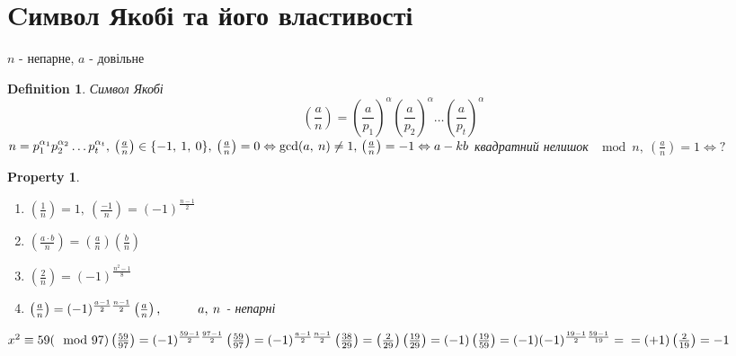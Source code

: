 \documentclass[a4paper,12pt]{bookest}
\newtheorem{definition}{Definition}[section]
\newtheorem*{property*}{Property}
\newcommand\tab[1][1cm]{\hspace*{#1}}
\begin{document}
\section{Cимвол Якобі та його властивості}
$n$ - непарне, $a$ - довільне
\begin{definition}Символ Якобі
	$$\left(\frac an\right)=\left(\frac a{p_1}\right)^\alpha\left(\frac a{p_2}\right)^\alpha\dots\left(\frac a{p_t}\right)^\alpha$$
	$n=p_1^{\alpha_1}p_2^{\alpha_2}\dots p_t^{\alpha_t},\>\left(\frac an\right)\in\{-1,\>1,\>0\},\>\left(\frac an\right)=0\Leftrightarrow\gcd(a,\>n)\ne 1,\\\left(\frac an\right)=-1\Leftrightarrow a-kb$ квадратний нелишок $\mod n,\>\left(\frac an\right)=1\Leftrightarrow?$
\end{definition}
\begin{property*}$ $
	\begin{enumerate}
		\item $\left(\frac 1n\right)=1,\>\left(\frac {-1}n\right)=(-1)^{\frac{n-1}{2}}$
		\item $\left(\frac {a\cdot b}n\right)=\left(\frac an\right)\left(\frac bn\right)$
		\item $\left(\frac 2n\right)=(-1)^{\frac{n^2-1}{8}}$
		\item $\left(\frac an\right)=(-1)^{\frac{a-1}{2}\frac{n-1}{2}}\left(\frac an\right),\tab a,\>n$ - непарні
	\end{enumerate}
\end{property*}
\begin{example}
	$x^2\equiv 59(\mod 97)\\\left(\frac {59}{97}\right)=(-1)^{\frac{59-1}{2}\frac{97-1}{2}}\left(\frac {59}{97}\right)=(-1)^{\frac{a-1}{2}\frac{n-1}{2}}\left(\frac {38}{29}\right)=\left(\frac {2}{29}\right)\left(\frac {19}{29}\right)=(-1) \left(\frac {19}{59}\right)=(-1)(-1)^{\frac{19-1}{2}\frac{59-1}{19}}=\\=(+1)\left(\frac {2}{19}\right)=-1$
\end{example}
\end{document}
